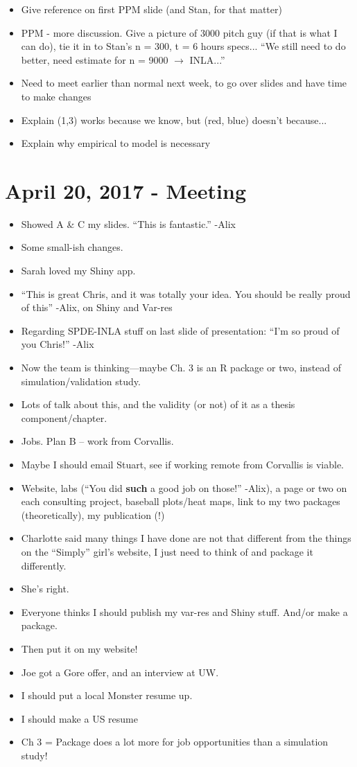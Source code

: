 \documentclass{article}
\begin{document}
\begin{itemize}
\item Give reference on first PPM slide (and Stan, for that matter)
\item PPM - more discussion. Give a picture of 3000 pitch guy (if that is what I can do), tie it in to Stan's n = 300, t = 6 hours specs... ``We still need to do better, need estimate for n = 9000 $\rightarrow$ INLA...''
\item Need to meet earlier than normal next week, to go over slides and have time to make changes
\item Explain (1,3) works because we know, but (red, blue) doesn't because...
\item Explain why empirical to model is necessary
\end{itemize}

\section*{April 20, 2017 - Meeting}
\begin{itemize}
\item Showed A \& C my slides. ``This is fantastic.'' -Alix
\item Some small-ish changes.
\item Sarah loved my Shiny app.
\item ``This is great Chris, and it was totally your idea. You should be really proud of this'' -Alix, on Shiny and Var-res
\item Regarding SPDE-INLA stuff on last slide of presentation: ``I'm so proud of you Chris!'' -Alix
\item Now the team is thinking---maybe Ch. 3 is an R package or two, instead of simulation/validation study.
\item Lots of talk about this, and the validity (or not) of it as a thesis component/chapter.
\item Jobs. Plan B -- work from Corvallis.
\item Maybe I should email Stuart, see if working remote from Corvallis is viable.
\item Website, labs (``You did {\bf such} a good job on those!'' -Alix), a page or two on each consulting project, baseball plots/heat maps, link to my two packages (theoretically), my publication (!)
\item Charlotte said many things I have done are not that different from the things on the ``Simply'' girl's website, I just need to think of and package it differently.
\item She's right.
\item Everyone thinks I should publish my var-res and Shiny stuff. And/or make a package.
\item Then put it on my website!
\item Joe got a Gore offer, and an interview at UW.
\item I should put a local Monster resume up.
\item I should make a US resume
\item Ch 3 = Package does a lot more for job opportunities than a simulation study!
\end{itemize}
\end{document}
